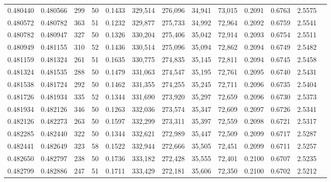 \begin{tabular}{rrrrrrrrrrrrr}
0.480440 & 0.480566 &   299 &  50 &                                     0.1433 & 329,514 & 276,096 &  34,941 &  73,015 & 0.2091 & 0.6763 & 2.5575 \\
0.480572 & 0.480782 &   363 &  51 &                                     0.1232 & 329,877 & 275,733 &  34,992 &  72,964 & 0.2092 & 0.6759 & 2.5541 \\
0.480782 & 0.480947 &   327 &  50 &                                     0.1326 & 330,204 & 275,406 &  35,042 &  72,914 & 0.2093 & 0.6754 & 2.5511 \\
0.480949 & 0.481155 &   310 &  52 &                                     0.1436 & 330,514 & 275,096 &  35,094 &  72,862 & 0.2094 & 0.6749 & 2.5482 \\
0.481159 & 0.481324 &   261 &  51 &                                     0.1635 & 330,775 & 274,835 &  35,145 &  72,811 & 0.2094 & 0.6745 & 2.5458 \\
0.481324 & 0.481535 &   288 &  50 &                                     0.1479 & 331,063 & 274,547 &  35,195 &  72,761 & 0.2095 & 0.6740 & 2.5431 \\
0.481538 & 0.481724 &   292 &  50 &                                     0.1462 & 331,355 & 274,255 &  35,245 &  72,711 & 0.2096 & 0.6735 & 2.5404 \\
0.481726 & 0.481934 &   335 &  52 &                                     0.1344 & 331,690 & 273,920 &  35,297 &  72,659 & 0.2096 & 0.6730 & 2.5373 \\
0.481934 & 0.482126 &   346 &  50 &                                     0.1263 & 332,036 & 273,574 &  35,347 &  72,609 & 0.2097 & 0.6726 & 2.5341 \\
0.482126 & 0.482273 &   263 &  50 &                                     0.1597 & 332,299 & 273,311 &  35,397 &  72,559 & 0.2098 & 0.6721 & 2.5317 \\
0.482285 & 0.482440 &   322 &  50 &                                     0.1344 & 332,621 & 272,989 &  35,447 &  72,509 & 0.2099 & 0.6717 & 2.5287 \\
0.482441 & 0.482649 &   323 &  58 &                                     0.1522 & 332,944 & 272,666 &  35,505 &  72,451 & 0.2099 & 0.6711 & 2.5257 \\
0.482650 & 0.482797 &   238 &  50 &                                     0.1736 & 333,182 & 272,428 &  35,555 &  72,401 & 0.2100 & 0.6707 & 2.5235 \\
0.482799 & 0.482886 &   247 &  51 &                                     0.1711 & 333,429 & 272,181 &  35,606 &  72,350 & 0.2100 & 0.6702 & 2.5212 \\

\end{tabular}
